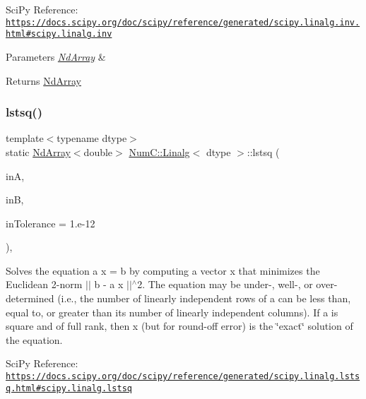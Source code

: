 Sci\+Py Reference\+: \href{https://docs.scipy.org/doc/scipy/reference/generated/scipy.linalg.inv.html#scipy.linalg.inv}{\tt https\+://docs.\+scipy.\+org/doc/scipy/reference/generated/scipy.\+linalg.\+inv.\+html\#scipy.\+linalg.\+inv}


\begin{DoxyParams}{Parameters}
{\em \mbox{\hyperlink{class_num_c_1_1_nd_array}{Nd\+Array}}} & \\
\hline
\end{DoxyParams}
\begin{DoxyReturn}{Returns}
\mbox{\hyperlink{class_num_c_1_1_nd_array}{Nd\+Array}} 
\end{DoxyReturn}
\mbox{\label{class_num_c_1_1_linalg_a1fce87cb93eb80648efcbcb01ddb3ae7}} 
\subsubsection{\texorpdfstring{lstsq()}{lstsq()}}
{\footnotesize\ttfamily template$<$typename dtype$>$ \\
static \mbox{\hyperlink{class_num_c_1_1_nd_array}{Nd\+Array}}$<$double$>$ \mbox{\hyperlink{class_num_c_1_1_linalg}{Num\+C\+::\+Linalg}}$<$ dtype $>$\+::lstsq (\begin{DoxyParamCaption}\item[{const \mbox{\hyperlink{class_num_c_1_1_nd_array}{Nd\+Array}}$<$ dtype $>$ \&}]{inA,  }\item[{const \mbox{\hyperlink{class_num_c_1_1_nd_array}{Nd\+Array}}$<$ dtype $>$ \&}]{inB,  }\item[{double}]{in\+Tolerance = {\ttfamily 1.e-\/12} }\end{DoxyParamCaption})\hspace{0.3cm}{\ttfamily [inline]}, {\ttfamily [static]}}

Solves the equation a x = b by computing a vector x that minimizes the Euclidean 2-\/norm $\vert$$\vert$ b -\/ a x $\vert$$\vert$$^\wedge$2. The equation may be under-\/, well-\/, or over-\/ determined (i.\+e., the number of linearly independent rows of a can be less than, equal to, or greater than its number of linearly independent columns). If a is square and of full rank, then x (but for round-\/off error) is the \char`\"{}exact\char`\"{} solution of the equation.

Sci\+Py Reference\+: \href{https://docs.scipy.org/doc/scipy/reference/generated/scipy.linalg.lstsq.html#scipy.linalg.lstsq}{\tt https\+://docs.\+scipy.\+org/doc/scipy/reference/generated/scipy.\+linalg.\+lstsq.\+html\#scipy.\+linalg.\+lstsq}


